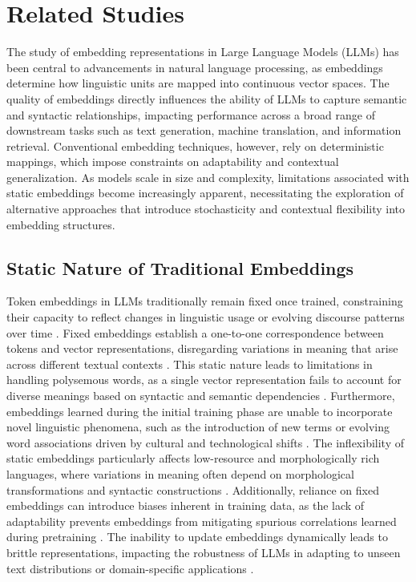 \section{Related Studies}
The study of embedding representations in Large Language Models (LLMs) has been central to advancements in natural language processing, as embeddings determine how linguistic units are mapped into continuous vector spaces. The quality of embeddings directly influences the ability of LLMs to capture semantic and syntactic relationships, impacting performance across a broad range of downstream tasks such as text generation, machine translation, and information retrieval. Conventional embedding techniques, however, rely on deterministic mappings, which impose constraints on adaptability and contextual generalization. As models scale in size and complexity, limitations associated with static embeddings become increasingly apparent, necessitating the exploration of alternative approaches that introduce stochasticity and contextual flexibility into embedding structures. 

\subsection{Static Nature of Traditional Embeddings}

Token embeddings in LLMs traditionally remain fixed once trained, constraining their capacity to reflect changes in linguistic usage or evolving discourse patterns over time \cite{ harrington2024recursive}. Fixed embeddings establish a one-to-one correspondence between tokens and vector representations, disregarding variations in meaning that arise across different textual contexts \cite{atox2024evaluating}. This static nature leads to limitations in handling polysemous words, as a single vector representation fails to account for diverse meanings based on syntactic and semantic dependencies \cite{grushail2024adaptive, raines2024enhancing}. Furthermore, embeddings learned during the initial training phase are unable to incorporate novel linguistic phenomena, such as the introduction of new terms or evolving word associations driven by cultural and technological shifts \cite{quinn2024applying}. The inflexibility of static embeddings particularly affects low-resource and morphologically rich languages, where variations in meaning often depend on morphological transformations and syntactic constructions \cite{ashcroft2024evaluation}. Additionally, reliance on fixed embeddings can introduce biases inherent in training data, as the lack of adaptability prevents embeddings from mitigating spurious correlations learned during pretraining \cite{romanovna2024dynamic}. The inability to update embeddings dynamically leads to brittle representations, impacting the robustness of LLMs in adapting to unseen text distributions or domain-specific applications \cite{fossan2024semantic}. 

